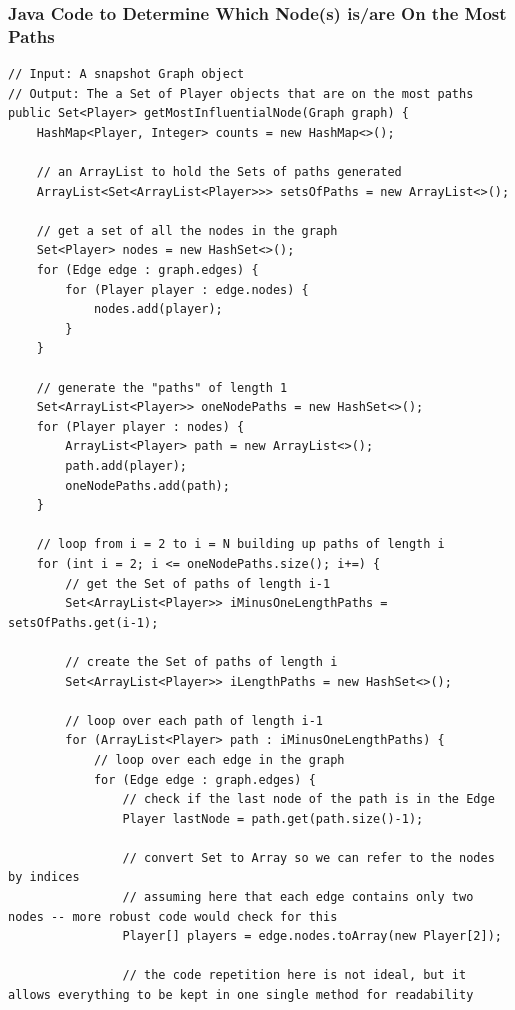 \documentclass[a4paper,11pt]{article}
\newenvironment{code}{\captionsetup{type=listing}}{}
\begin{document}
\subsubsection{Java Code to Determine Which Node(s) is/are On the Most Paths}
\begin{code}
\begin{verbatim}
// Input: A snapshot Graph object
// Output: The a Set of Player objects that are on the most paths
public Set<Player> getMostInfluentialNode(Graph graph) {
    HashMap<Player, Integer> counts = new HashMap<>();

    // an ArrayList to hold the Sets of paths generated
    ArrayList<Set<ArrayList<Player>>> setsOfPaths = new ArrayList<>();

    // get a set of all the nodes in the graph
    Set<Player> nodes = new HashSet<>();
    for (Edge edge : graph.edges) {
        for (Player player : edge.nodes) {
            nodes.add(player);
        }
    }

    // generate the "paths" of length 1
    Set<ArrayList<Player>> oneNodePaths = new HashSet<>();
    for (Player player : nodes) {
        ArrayList<Player> path = new ArrayList<>();
        path.add(player);
        oneNodePaths.add(path);
    }

    // loop from i = 2 to i = N building up paths of length i
    for (int i = 2; i <= oneNodePaths.size(); i+=) {
        // get the Set of paths of length i-1
        Set<ArrayList<Player>> iMinusOneLengthPaths = setsOfPaths.get(i-1);

        // create the Set of paths of length i
        Set<ArrayList<Player>> iLengthPaths = new HashSet<>();

        // loop over each path of length i-1
        for (ArrayList<Player> path : iMinusOneLengthPaths) {
            // loop over each edge in the graph 
            for (Edge edge : graph.edges) {
                // check if the last node of the path is in the Edge
                Player lastNode = path.get(path.size()-1);

                // convert Set to Array so we can refer to the nodes by indices
                // assuming here that each edge contains only two nodes -- more robust code would check for this
                Player[] players = edge.nodes.toArray(new Player[2]);

                // the code repetition here is not ideal, but it allows everything to be kept in one single method for readability


\end{verbatim}
\end{code}
\end{document}
